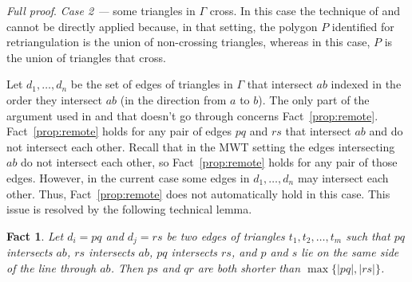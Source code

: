 \documentclass[final]{siamltex}
\newcommand{\polygon}{P}
\newtheorem{fact}{Fact}[theorem]
\newenvironment{fullproof}{\par{\it Full proof}. \ignorespaces}{\endproof}
\begin{document}
\begin{fullproof}
\noindent
{\em Case 2 ---} some triangles in $\Gamma$ cross.  In this case the technique of \cite{keil1994computing} and 
\cite{cheng1996approaching} cannot be directly applied because,
in that setting, the polygon $\polygon$ identified for retriangulation 
is the union of non-crossing triangles,
whereas in this case, $\polygon$ is the union of triangles that cross.

Let $d_1,\ldots,d_n$ be the set of edges of triangles in $\Gamma$ that intersect $a b$ 
indexed in the order they intersect $a b$ (in the direction from $a$ to $b$).
The only part of the argument used in \cite{keil1994computing} and 
\cite{cheng1996approaching} that doesn't go through concerns Fact~\ref{prop:remote}. 
Fact~\ref{prop:remote} holds for any pair of edges $p q$ and $r s$ that 
intersect $a b$ and do not intersect each other. Recall that in the MWT setting the edges intersecting $a b$ 
do not intersect each other, so Fact~\ref{prop:remote} holds for any pair 
of those edges. However, in the current case some edges in $d_1,\ldots,d_n$ may intersect each other. 
Thus, Fact~\ref{prop:remote} does not automatically hold in this case.  
This issue is resolved by the following technical lemma.
\begin{fact}\label{obs:point}
Let $d_i=p q$ and $d_j=r s$ be two edges of triangles $t_1,t_2,\ldots,t_m$ such that 
$p q$ intersects $a b$, $r s$ intersects $a b$, $p q$ 
intersects $r s$, and $p$ and $s$ lie on the same side of the line through $a b$.
Then $p s$ and $q r$ are both shorter than $\max\{|p q|,|r s|\}$.  
\end{fact}




\end{fullproof}
\end{document}
